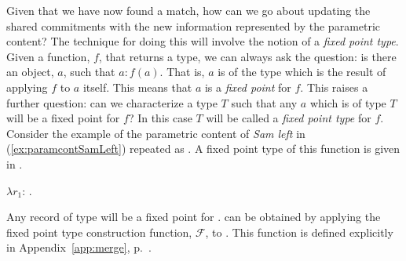 Given that we have now found a match, how can we go about updating the
shared commitments with the new information represented by the
parametric content?  The technique for doing this will involve the
notion of a \textit{fixed point type}.  Given a function, $f$, that returns
a type, we can always ask the question:  is there an object, $a$, such
that $a:f(a)$.  That is, $a$ is of the type which is the result of
applying $f$ to $a$ itself.  This means that $a$ is a \textit{fixed
  point} for $f$.  This raises a further question: can we characterize
a type $T$ such that any $a$ which is of type $T$ will be a fixed
point for $f$?  In this case $T$ will be called a \textit{fixed point
  type} for $f$.  Consider the example of the parametric content of
\textit{Sam left} in (\ref{ex:paramcontSamLeft}) repeated as
.  A fixed point type of this function is given in
.
\begin{ex} 
\begin{subex} 
 
\item $\lambda
  r_1$: . 
 
\item {} 
 
\end{subex} 
\label{ex:parcontfixedpoint}   
\end{ex} 
Any record of type  will be a fixed point for
.  can be obtained by applying the fixed point
type construction function, $\mathcal{F}$, to .  This
function is defined explicitly in Appendix~\ref{app:merge},
p.~\pageref{pg:fixedpointtype}. 

